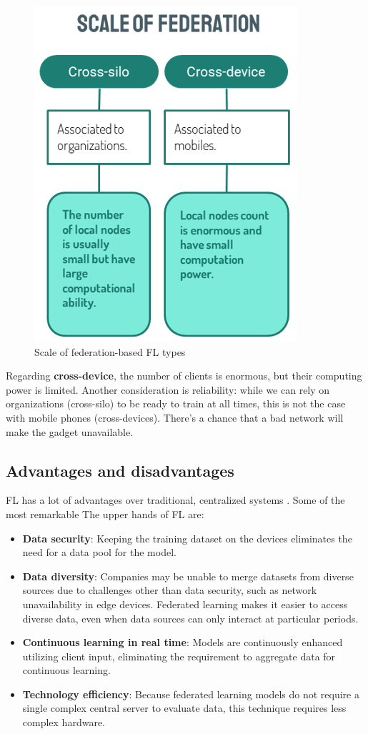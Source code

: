 \begin{figure}[H]
\centering
\includegraphics[scale=0.5]{img/fl_scale.png}
\caption{Scale of federation-based FL types}
\label{fig:fl_scale}
\end{figure}

Regarding \textbf{cross-device}, the number of clients is enormous, but their computing power is limited. Another consideration is reliability: while we can rely on organizations (cross-silo) to be ready to train at all times, this is not the case with mobile phones (cross-devices). There's a chance that a bad network will make the gadget unavailable.

\subsection{Advantages and disadvantages}

FL has a lot of advantages over traditional, centralized systems \cite{fl27_adv_disadv}. Some of the most remarkable The upper hands of FL are:

\begin{itemize}
    \item \textbf{Data security}: Keeping the training dataset on the devices eliminates the need for a data pool for the model.
    \item \textbf{Data diversity}: Companies may be unable to merge datasets from diverse sources due to challenges other than data security, such as network unavailability in edge devices. Federated learning makes it easier to access diverse data, even when data sources can only interact at particular periods.
    \item \textbf{Continuous learning in real time}: Models are continuously enhanced utilizing client input, eliminating the requirement to aggregate data for continuous learning.
    \item \textbf{Technology efficiency}: Because federated learning models do not require a single complex central server to evaluate data, this technique requires less complex hardware.
\end{itemize}

